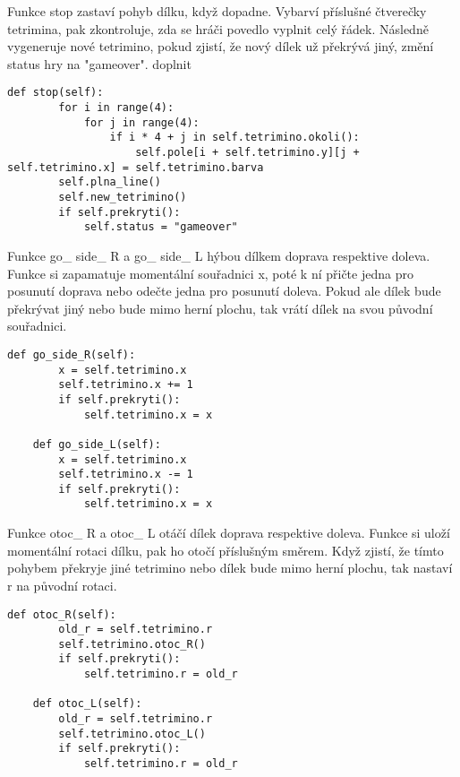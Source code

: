 \documentclass[12pt]{report}			%
\begin{document}
Funkce stop zastaví pohyb dílku, když dopadne. Vybarví příslušné čtverečky tetrimina, pak zkontroluje, zda se hráči povedlo vyplnit celý řádek. Následně vygeneruje nové tetrimino, pokud zjistí, že nový dílek už překrývá jiný, změní status hry na "gameover".
doplnit
\begin{lstlisting}[title={Program tetris.py}, caption={Funkce stop}, 							label={lst:tetris.py}]
    def stop(self):
        for i in range(4):
            for j in range(4):
                if i * 4 + j in self.tetrimino.okoli():
                    self.pole[i + self.tetrimino.y][j + self.tetrimino.x] = self.tetrimino.barva
        self.plna_line()
        self.new_tetrimino()
        if self.prekryti():
            self.status = "gameover"
\end{lstlisting}
Funkce go\_ side\_ R a go\_ side\_ L hýbou dílkem doprava respektive doleva. Funkce si zapamatuje momentální souřadnici x, poté k ní přičte jedna pro posunutí doprava nebo odečte jedna pro posunutí doleva. Pokud ale dílek bude překrývat jiný nebo bude mimo herní plochu, tak vrátí dílek na svou původní souřadnici.
\begin{lstlisting}[title={Program tetris.py}, caption={Funkce go\_ side\_ R a go\_ side\_ L}, 							label={lst:tetris.py}]
    def go_side_R(self):
        x = self.tetrimino.x
        self.tetrimino.x += 1
        if self.prekryti():
            self.tetrimino.x = x
            
    def go_side_L(self):
        x = self.tetrimino.x
        self.tetrimino.x -= 1
        if self.prekryti():
            self.tetrimino.x = x
\end{lstlisting}
Funkce otoc\_ R a otoc\_ L otáčí dílek doprava respektive doleva. Funkce si uloží momentální rotaci dílku, pak ho otočí příslušným směrem. Když zjistí, že tímto pohybem překryje jiné tetrimino nebo dílek bude mimo herní plochu, tak nastaví r na původní rotaci.
\begin{lstlisting}[title={Program tetris.py}, caption={Funkce otoc\_ R a otoc\_ L}, 							label={lst:tetris.py}]
    def otoc_R(self):
        old_r = self.tetrimino.r
        self.tetrimino.otoc_R()
        if self.prekryti():
            self.tetrimino.r = old_r

    def otoc_L(self):
        old_r = self.tetrimino.r
        self.tetrimino.otoc_L()
        if self.prekryti():
            self.tetrimino.r = old_r
\end{lstlisting}
\end{document}
